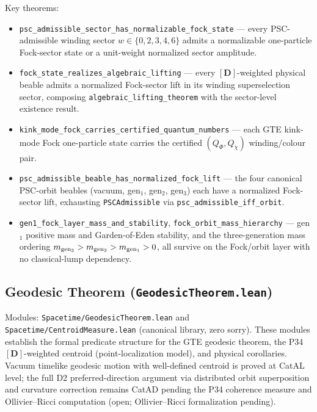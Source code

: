 \documentclass[11pt,a4paper]{article}
\theoremstyle{definition}
\begin{document}
Key theorems:
\begin{itemize}[nosep]
\item \lstinline|psc_admissible_sector_has_normalizable_fock_state| --- every
  PSC-admissible winding sector $w \in \{0,2,3,4,6\}$ admits a normalizable
  one-particle Fock-sector state or a unit-weight normalized sector amplitude.
\item \lstinline|fock_state_realizes_algebraic_lifting| --- every
  $[\mathbf{D}]$-weighted physical beable admits a normalized Fock-sector lift
  in its winding superselection sector, composing
  \lstinline|algebraic_lifting_theorem| with the sector-level existence result.
\item \lstinline|kink_mode_fock_carries_certified_quantum_numbers| --- each
  GTE kink-mode Fock one-particle state carries the certified
  $(Q_\Phi, Q_\chi)$ winding/colour pair.
\item \lstinline|psc_admissible_beable_has_normalized_fock_lift| --- the four
  canonical PSC-orbit beables (vacuum, gen$_1$, gen$_2$, gen$_3$) each have a
  normalized Fock-sector lift, exhausting \lstinline|PSCAdmissible| via
  \lstinline|psc_admissible_iff_orbit|.
\item \lstinline|gen1_fock_layer_mass_and_stability|,
  \lstinline|fock_orbit_mass_hierarchy| --- gen$_1$ positive mass and
  Garden-of-Eden stability, and the three-generation mass ordering
  $m_{\rm gen_3} > m_{\rm gen_2} > m_{\rm gen_1} > 0$, all survive on the
  Fock/orbit layer with no classical-lump dependency.
\end{itemize}

\subsection{Geodesic Theorem (\texttt{GeodesicTheorem.lean})}\label{subsec:geodesic-theorem}

Modules: \texttt{Spacetime/GeodesicTheorem.lean} and \texttt{Spacetime/CentroidMeasure.lean}
(canonical library, zero sorry).
These modules establish the formal predicate structure for the GTE geodesic theorem,
the P34 $[\mathbf{D}]$-weighted centroid (point-localization model), and physical
corollaries.  Vacuum timelike geodesic motion with well-defined centroid is proved
at CatAL level; the full D2 preferred-direction argument via distributed orbit
superposition and curvature correction remains CatAD pending the P34 coherence
measure and Ollivier--Ricci computation (open; Ollivier--Ricci formalization pending).
\end{document}

